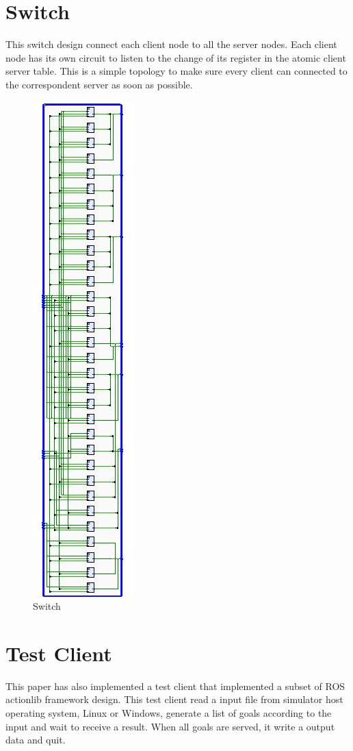 \section{Switch}

This switch design connect each client node to all the server nodes. Each client node has its own circuit to listen to the change of its register in the atomic client server table. This is a simple topology to make sure every client can connected to the correspondent server as soon as possible.

\begin{figure}[htb]
	\centering
	\includegraphics[width=.25\linewidth]{figures/new-sim/switch.png}
	\caption{Switch}
	\label{fig:switch}
\end{figure}

\section{Test Client}

This paper has also implemented a test client that implemented a subset of ROS actionlib framework design. This test client read a input file from simulator host operating system, Linux or Windows, generate a list of goals according to the input and wait to receive a result. When all goals are served, it write a output data and quit.

